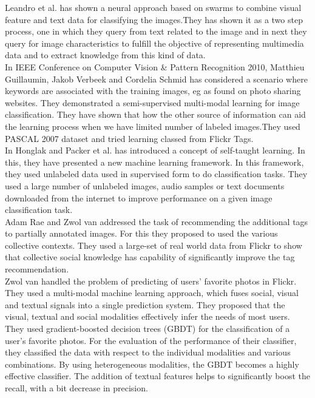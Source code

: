 \hspace*{1cm}  Leandro et al. \cite{silva}has shown a neural approach based on swarms to combine visual feature and text data for classifying the images.They has shown it as a two step process, one in which they query from text related to the image and in next they query for image characteristics to fulfill the objective of representing multimedia data and to extract knowledge from this kind of data.\\
\hspace*{1cm} In IEEE Conference on Computer Vision \& Pattern Recognition 2010, Matthieu Guillaumin, Jakob Verbeek and Cordelia Schmid has considered a scenario where keywords are associated with the training images, eg as found on photo sharing websites. They demonstrated a semi-supervised multi-modal learning for image classification. They have shown that how the other source of information can aid the learning process when we have limited number of labeled images.They used PASCAL 2007 dataset and tried learning classed from Flickr Tags.\\
\hspace*{1cm} In \cite{raina} Honglak and Packer et al. has introduced a concept of self-taught learning. In this, they have presented a new machine learning framework. In this framework, they used unlabeled data used in supervised form to do classification tasks. They used a large number of unlabeled images, audio samples or text documents downloaded from the internet to improve performance on a given image classification task.\\
\hspace*{1cm} Adam Rae and Zwol van \cite{rae} addressed the task of recommending the additional tags to partially annotated images. For this they proposed to used the various collective contexts. They used a large-set of real world data from Flickr to show that collective social knowledge has capability of significantly improve the tag recommendation.\\
\hspace*{1cm} Zwol van \cite{vanZwol} handled the problem of predicting of users' favorite photos in Flickr. They used a multi-modal machine learning approach, which fuses social, visual and textual signals into a single prediction system. They proposed that the  visual, textual and social modalities effectively infer the needs of most users. They used gradient-boosted decision trees (GBDT) for the classification of a user's favorite photos. For the evaluation of the performance of their classifier, they classified the data with respect to the individual modalities and various combinations. By using heterogeneous modalities, the GBDT becomes a highly effective classifier. The addition of textual features helps to  significantly boost the recall, with a bit decrease in precision.\\
